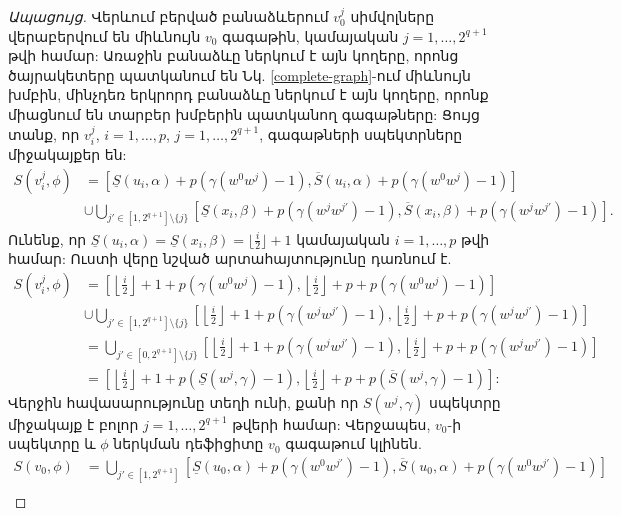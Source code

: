 \begin{proof}[Ապացույց]
Վերևում բերված բանաձևերում $v_0^j$ սիմվոլները վերաբերվում են միևնույն $v_0$ գագաթին, %
կամայական $j=1,\ldots,2^{q+1}$ թվի համար: %
Առաջին բանաձևը ներկում է այն կողերը, որոնց ծայրակետերը պատկանում են Նկ. \ref{complete-graph}-ում միևնույն խմբին, մինչդեռ երկրորդ բանաձևը ներկում է այն կողերը, որոնք միացնում են տարբեր խմբերին պատկանող գագաթները: Ցույց տանք, որ $v_i^j$, $i=1,\ldots,p$, $j=1,\ldots,2^{q+1}$, գագաթների սպեկտրները միջակայքեր են:
\begin{align*}
    S\left(v^j_i,\phi\right) &= \left[\underline{S}(u_i, \alpha) + p\left(\gamma(w^0w^j) - 1\right), \overline{S}(u_i, \alpha) + p\left(\gamma(w^0w^j) - 1\right)\right] \\
    &\cup \bigcup\limits_{j'\in [1, 2^{q+1}] \setminus \{j\}}{\left[\underline{S}(x_i, \beta) + p\left(\gamma(w^jw^{j'}) - 1\right), \overline{S}(x_i, \beta) + p\left(\gamma(w^jw^{j'}) - 1\right) \right]}.
\end{align*}
Ունենք, որ $\underline{S}(u_i, \alpha) = \underline{S}(x_i, \beta) = \lfloor \frac{i}{2} \rfloor + 1$ կամայական $i = 1,\ldots,p$ թվի համար: %
Ուստի վերը նշված արտահայտությունը դառնում է.
\begin{align*}
    S\left(v^j_i,\phi\right) &= \left[\left\lfloor \frac{i}{2} \right\rfloor + 1 + p\left(\gamma(w^0w^j) - 1\right), \left\lfloor \frac{i}{2} \right\rfloor + p + p\left(\gamma(w^0w^j) - 1\right)\right] \\
    &\cup \bigcup\limits_{j'\in [1, 2^{q+1}] \setminus \{j\}}{\left[\left\lfloor \frac{i}{2} \right\rfloor + 1 + p\left(\gamma(w^jw^{j'}) - 1\right), \left\lfloor \frac{i}{2} \right\rfloor + p + p\left(\gamma(w^jw^{j'}) - 1\right) \right]}\\
    &= \bigcup\limits_{j'\in [0, 2^{q+1}] \setminus \{j\}}{\left[\left\lfloor \frac{i}{2} \right\rfloor + 1 + p\left(\gamma(w^jw^{j'}) - 1\right), \left\lfloor \frac{i}{2} \right\rfloor + p + p\left(\gamma(w^jw^{j'}) - 1\right) \right]}\\
    &= \left[\left\lfloor \frac{i}{2} \right\rfloor + 1 + p\left(\underline{S}(w^j,\gamma) - 1\right), \left\lfloor \frac{i}{2} \right\rfloor + p + p\left(\overline{S}(w^j,\gamma) - 1\right) \right]:
\end{align*}
Վերջին հավասարությունը տեղի ունի, քանի որ $S\left(w^j, \gamma\right)$ սպեկտրը միջակայք է բոլոր $j=1,\ldots,2^{q+1}$ թվերի համար: Վերջապես, $v_0$-ի սպեկտրը և $\phi$ ներկման դեֆիցիտը $v_0$ գագաթում կլինեն.
\begin{align*}
    S\left(v_0,\phi\right) &= \bigcup\limits_{j'\in [1, 2^{q+1}]} {\left[ \underline{S}(u_0, \alpha) + p\left(\gamma(w^0w^{j'}) - 1\right), \overline{S}(u_0, \alpha) + p\left(\gamma(w^0w^{j'}) - 1\right) \right]}\\

\end{align*}
\end{proof}
